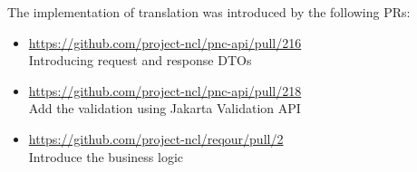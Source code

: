 \documentclass[../main.text]{subfiles}
\begin{document}
The implementation of translation was introduced by the following PRs:
\begin{itemize}
    \item \url{https://github.com/project-ncl/pnc-api/pull/216}\\
    Introducing request and response DTOs

    \item \url{https://github.com/project-ncl/pnc-api/pull/218}\\
    Add the validation using Jakarta Validation API

    \item \url{https://github.com/project-ncl/reqour/pull/2}\\
    Introduce the business logic
\end{itemize}
\end{document}
